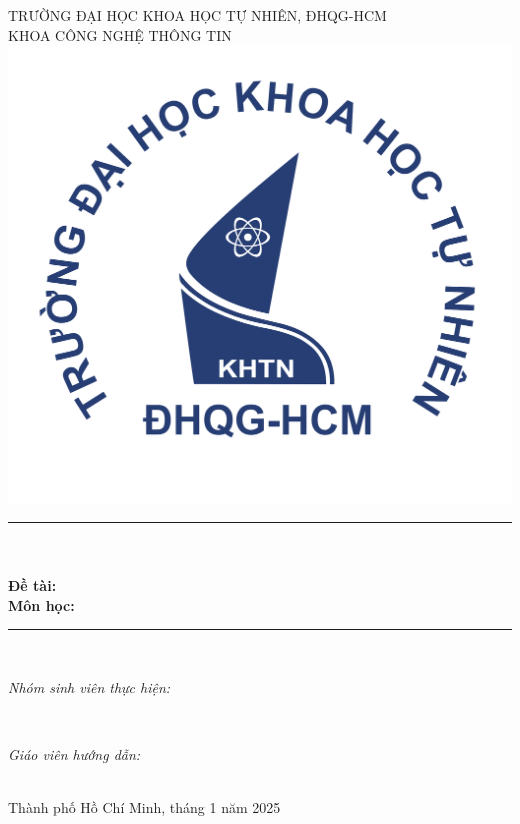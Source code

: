 \begin{titlepage}
\newcommand{\HRule}{\rule{\linewidth}{0.5mm}}
\centering

\vspace*{-2cm}
\textsc{\Large TRƯỜNG ĐẠI HỌC KHOA HỌC TỰ NHIÊN, ĐHQG-HCM}\\[0.3cm]
\textsc{\Large KHOA CÔNG NGHỆ THÔNG TIN}\\[1cm]

\includegraphics[scale=.40]{img/logo_hcmus.png}\\

\HRule \\[0.3cm]
{ 
\Large{\bfseries{\reporttitle}}\\
\Large\bfseries Đề tài: \huge{\bfseries{\reportname}}\\[0.5cm]
\Large{\bfseries{Môn học: \coursename}}
}\\[0.3cm]
\HRule \\[0.3cm]

\begin{minipage}[t]{0.45\textwidth}
\begin{flushleft} \large
\emph{Nhóm sinh viên thực hiện:}\\
\studentname
\end{flushleft}
\end{minipage}
~
\begin{minipage}[t]{0.4\textwidth}
\begin{flushright} \large
\emph{Giáo viên hướng dẫn:} \\
\teachername
\end{flushright}
\end{minipage}\\[3.5cm]

\Large Thành phố Hồ Chí Minh, tháng 1 năm 2025

\vfill
\end{titlepage}